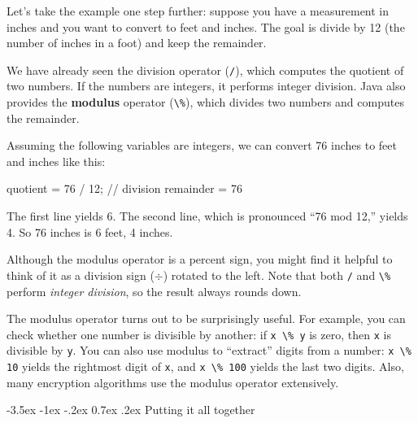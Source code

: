 \documentclass[12pt]{book}
\makeatletter
\theoremstyle{exercise}
\newcommand{\java}[1]{\verb"#1"}
\renewcommand{\section}{\@startsection{section}{1}{\z@}%
    {-3.5ex \@plus -1ex \@minus -.2ex}%
    {0.7ex \@plus.2ex}%
    {\normalfont\Large\bfseries}}
\newcommand{\java}[1]{\lstinline{#1}} %
\makeatother
\begin{document}
Let's take the example one step further: suppose you have a measurement in inches and you want to convert to feet and inches.
The goal is divide by 12 (the number of inches in a foot) and keep the remainder.


We have already seen the division operator (\java{/}), which computes the quotient of two numbers.
If the numbers are integers, it performs integer division.
Java also provides the {\bf modulus} operator (\java{\%}), which divides two numbers and computes the remainder.

Assuming the following variables are integers, we can convert 76 inches to feet and inches like this:

\begin{code}
    quotient = 76 / 12;   // division
    remainder = 76 %
\end{code}

The first line yields 6.
The second line, which is pronounced ``76 mod 12,'' yields 4.
So 76 inches is 6 feet, 4 inches.

Although the modulus operator is a percent sign, you might find it helpful to think of it as a division sign ($\div$) rotated to the left.
Note that both \java{/} and \java{\%} perform {\em integer division}, so the result always rounds down.


The modulus operator turns out to be surprisingly useful.
For example, you can check whether one number is divisible by another: if \java{x \% y} is zero, then \java{x} is divisible by \java{y}.
You can also use modulus to ``extract'' digits from a number: \java{x \% 10} yields the rightmost digit of \java{x}, and \java{x \% 100} yields the last two digits.
Also, many encryption algorithms use the modulus operator extensively.


\section{Putting it all together}


\end{document}
